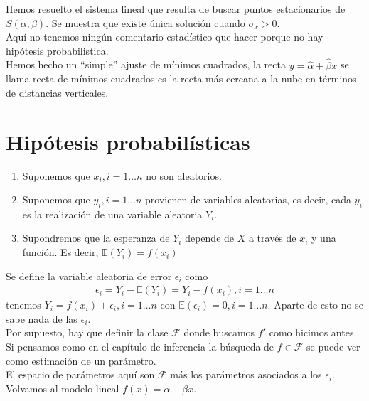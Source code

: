 \documentclass[10pt]{article}
\theoremstyle{plain}
\theoremstyle{definition}
\begin{document}
Hemos resuelto el sistema lineal que resulta de buscar puntos estacionarios de $S(\alpha, \beta)$. Se muestra que existe única solución cuando $\sigma_{x}>0$.\\

Aquí no tenemos ningún comentario estadístico que hacer porque no hay hipótesis probabilistica.\\

Hemos hecho un ``simple'' ajuste de mínimos cuadrados, la recta $y = \hat{\alpha} + \hat{\beta}x$ se llama recta de mínimos cuadrados es la recta más cercana a la nube en términos de distancias verticales.

\section{Hipótesis probabilísticas}
\begin{enumerate}
\item Suponemos que $x_{i}, i = 1\ldots n$ no son aleatorios.
\item Suponemos que $y_{i}, i = 1\ldots n$ provienen de variables aleatorias, es decir, cada $y_{i}$ es la realización de una variable aleatoria $Y_{i}$.
\item Supondremos que la esperanza de $Y_{i}$ depende de $X$ a través de $x_{i}$ y una función. Es decir, $\mathbb{E}(Y_{i}) = f(x_{i})$
\end{enumerate}
Se define la variable aleatoria de error $\epsilon_{i}$ como
\begin{align*}
\epsilon_{i} = Y_{i} - \mathbb{E}(Y_{i}) = Y_{i} - f(x_{i}),i = 1\ldots n
\end{align*}
tenemos $Y_{i} = f(x_{i}) + \epsilon_{i}, i = 1\ldots n$ con $\mathbb{E}(\epsilon_{i}) = 0, i = 1\ldots n$. Aparte de esto no se sabe nada de las $\epsilon_{i}$.\\

Por supuesto, hay que definir la clase $\mathcal{F}$ donde buscamos $f'$ como hicimos antes.\\

Si pensamos como en el capítulo de inferencia la búsqueda de $f\in \mathcal{F}$ se puede ver como estimación de un parámetro.\\

El espacio de parámetros aquí son $\mathcal{F}$ más los parámetros asociados a los $\epsilon_{i}$.\\

Volvamos al modelo lineal $f(x) = \alpha + \beta x$.\\
\end{document}
